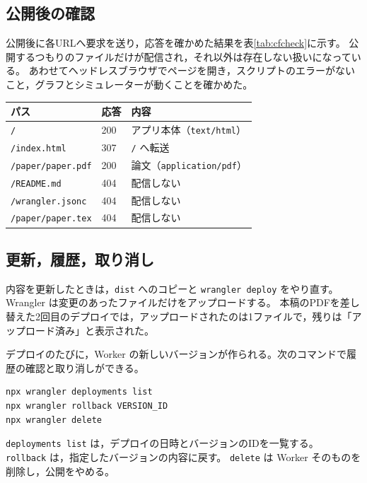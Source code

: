 \documentclass[paper=a4,fontsize=10pt]{jlreq}
\newenvironment{heretable}
  {\par\addvspace{\intextsep}\noindent\begin{minipage}{\linewidth}\centering}
  {\end{minipage}\par\addvspace{\intextsep}}
\newcommand{\code}[1]{\texttt{#1}}
\begin{document}
\subsection{公開後の確認}

公開後に各URLへ要求を送り，応答を確かめた結果を表\ref{tab:cfcheck}に示す。
公開するつもりのファイルだけが配信され，それ以外は存在しない扱いになっている。
あわせてヘッドレスブラウザでページを開き，スクリプトのエラーがないこと，グラフとシミュレーターが動くことを確かめた。

\begin{heretable}
  \label{tab:cfcheck}
  \begin{tabular}{lll}
    \toprule
    パス & 応答 & 内容 \\
    \midrule
    \code{/} & 200 & アプリ本体（\code{text/html}） \\
    \code{/index.html} & 307 & \code{/} へ転送 \\
    \code{/paper/paper.pdf} & 200 & 論文（\code{application/pdf}） \\
    \code{/README.md} & 404 & 配信しない \\
    \code{/wrangler.jsonc} & 404 & 配信しない \\
    \code{/paper/paper.tex} & 404 & 配信しない \\
    \bottomrule
  \end{tabular}
\end{heretable}

\subsection{更新，履歴，取り消し}

内容を更新したときは，\code{dist} へのコピーと \code{wrangler deploy} をやり直す。
Wrangler は変更のあったファイルだけをアップロードする。
本稿のPDFを差し替えた2回目のデプロイでは，アップロードされたのは1ファイルで，残りは「アップロード済み」と表示された。

デプロイのたびに，Worker の新しいバージョンが作られる。次のコマンドで履歴の確認と取り消しができる。
\begin{lstlisting}
npx wrangler deployments list
npx wrangler rollback VERSION_ID
npx wrangler delete
\end{lstlisting}
\code{deployments list} は，デプロイの日時とバージョンのIDを一覧する。
\code{rollback} は，指定したバージョンの内容に戻す。
\code{delete} は Worker そのものを削除し，公開をやめる。
\end{document}
